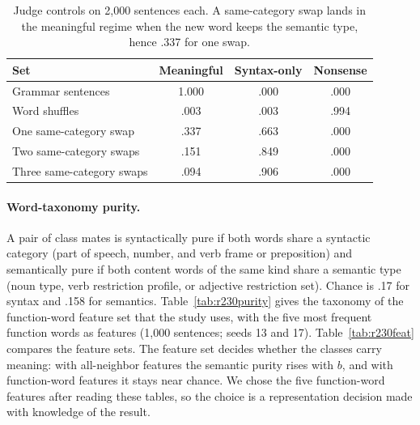 \documentclass[11pt,letterpaper]{article}
\begin{document}
\begin{table}[h]
\caption{Judge controls on 2,000 sentences each. A same-category swap lands in the meaningful regime when the new word keeps the semantic type, hence .337 for one swap.}
\label{tab:r230controls}
\begin{center}
\small
\begin{tabular}{lccc}
\toprule
Set & Meaningful & Syntax-only & Nonsense \\
\midrule
Grammar sentences & 1.000 & .000 & .000 \\
Word shuffles & .003 & .003 & .994 \\
One same-category swap & .337 & .663 & .000 \\
Two same-category swaps & .151 & .849 & .000 \\
Three same-category swaps & .094 & .906 & .000 \\
\bottomrule
\end{tabular}
\end{center}
\end{table}

\paragraph{Word-taxonomy purity.} A pair of class mates is syntactically pure if both words share a syntactic category (part of speech, number, and verb frame or preposition) and semantically pure if both content words of the same kind share a semantic type (noun type, verb restriction profile, or adjective restriction set).
Chance is .17 for syntax and .158 for semantics. Table~\ref{tab:r230purity} gives the taxonomy of the function-word feature set that the study uses, with the five most frequent function words as features (1,000 sentences; seeds 13 and 17).
Table~\ref{tab:r230feat} compares the feature sets. The feature set decides whether the classes carry meaning: with all-neighbor features the semantic purity rises with $b$, and with function-word features it stays near chance.
We chose the five function-word features after reading these tables, so the choice is a representation decision made with knowledge of the result.
\end{document}
